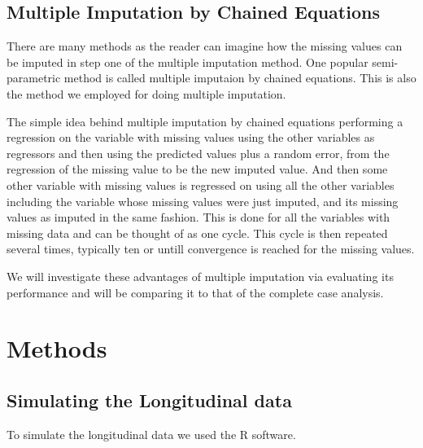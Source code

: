\documentclass[fleqn,10pt]{wlscirep}\usepackage[]{graphicx}\usepackage[]{color}
\begin{document}
\subsection{Multiple Imputation by Chained Equations}

There are many methods as the reader can imagine how the missing values can be imputed in step one of the multiple imputation method. One popular semi-parametric method is called multiple imputaion by chained equations. This is also the method we employed for doing multiple imputation. 

The simple idea behind multiple imputation by chained equations performing a regression on the variable with missing values using the other variables as regressors and then using the predicted values plus a random error, from the regression of the missing value to be the new imputed value. And then some other variable with missing values is regressed on using all the other variables including the variable whose missing values were just imputed, and its missing values as imputed in the same fashion. This is done for all the variables with missing data and can be thought of as one cycle. This cycle is then repeated several times, typically ten or untill convergence is reached for the missing values.\cite{Azur:2011}  

We will investigate these advantages of multiple imputation via evaluating its performance and will be comparing it to that of the complete case analysis. 


\section{Methods}

\subsection{Simulating the Longitudinal data}

To simulate the longitudinal data we used the R software. 
\end{document}
